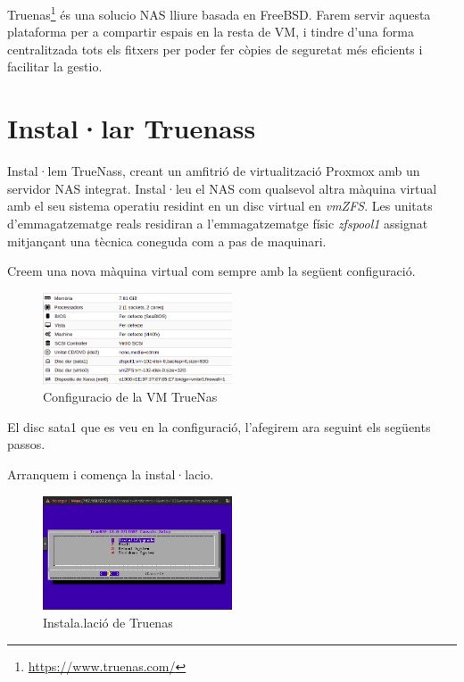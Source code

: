 \documentclass[
  10pt,
]{krantz}
\DeclareRobustCommand{\href}[2]{#2\footnote{\url{#1}}}
\begin{document}
\href{https://www.truenas.com/}{Truenas} és una solucio NAS lliure basada en FreeBSD. Farem servir aquesta plataforma per a compartir espais en la resta de VM, i tindre d'una forma centralitzada tots els fitxers per poder fer còpies de seguretat més eficients i facilitar la gestio.

\hypertarget{installar-truenass}{%
\section{Instal·lar Truenass}\label{installar-truenass}}

Instal·lem TrueNass, creant un amfitrió de virtualització Proxmox amb un servidor NAS integrat. Instal·leu el NAS com qualsevol altra màquina virtual amb el seu sistema operatiu residint en un disc virtual en \emph{vmZFS}. Les unitats d'emmagatzematge reals residiran a l'emmagatzematge físic \emph{zfspool1} assignat mitjançant una tècnica coneguda com a pas de maquinari.

Creem una nova màquina virtual com sempre amb la següent configuració.

\begin{figure}
\centering
\includegraphics[width=0.5\textwidth,height=\textheight]{imatges/proxmox/truenas_config.png}
\caption{Configuracio de la VM TrueNas}
\end{figure}

\begin{rmdinfo}{}
El disc sata1 que es veu en la configuració, l'afegirem ara seguint els següents passos.

\end{rmdinfo}

Arranquem i comença la instal·lacio.

\begin{figure}
\centering
\includegraphics[width=0.5\textwidth,height=\textheight]{imatges/proxmox/truenas_in1.png}
\caption{Instala.lació de Truenas}
\end{figure}
\end{document}
